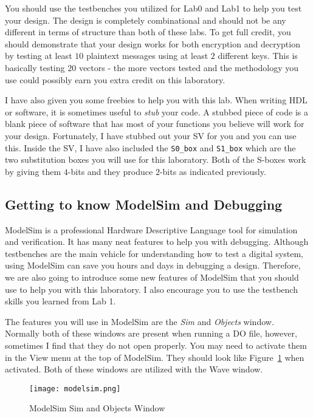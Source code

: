\documentclass{article}
\begin{document}
You should use the testbenches you utilized for Lab0 and Lab1 to help
you test your design.  The design is completely combinational and
should not be any different in terms of structure than both of these
labs.  To get full credit, you should demonstrate that your design
works for both encryption and decryption by testing at least $10$
plaintext messages using at least $2$ different keys.  This is
basically testing $20$ vectors - the more vectors tested and the
methodology you use could possibly
earn you extra credit on this laboratory.

I have also given you some freebies to help you with this lab.  When
writing HDL or software, it is sometimes useful to \textit{stub} your
code.  A stubbed piece of code is a blank piece of software that has
most of your functions you believe will work for your design.
Fortunately, I have stubbed out your SV for you and you can use this.
Inside the SV, I have also included the \verb!S0_box! and
\verb!S1_box! which are the two substitution boxes you will use for
this laboratory.  Both of the S-boxes work by giving them $4$-bits and
they produce $2$-bits as indicated previously. 

\subsection{Getting to know ModelSim and Debugging}

ModelSim is a professional Hardware Descriptive Language tool for
simulation and verification.  It has many neat features to help you
with debugging.  Although testbenches are the main vehicle for
understanding how to test a digital system, using ModelSim can save
you hours and days in debugging a design.  Therefore, we are also
going to introduce some new features of ModelSim that you should use
to help you with this laboratory. I also encourage you to use the
testbench skills you learned from Lab 1.

The features you will use in ModelSim are the \textit{Sim} and
\textit{Objects} window.  Normally both of these windows are present
when running a DO file, however, sometimes I find that they do not
open properly.  You may need to activate them in the View menu at the
top of ModelSim.  They should look like Figure~\ref{modelsim.png} when
activated.  Both of these windows are utilized with the Wave window.
\begin{figure} [t!]
  \centering
  \texttt{[image: modelsim.png]}
  \caption{ModelSim Sim and Objects Window}
  \label{modelsim.png}
\end{figure}
\end{document}
